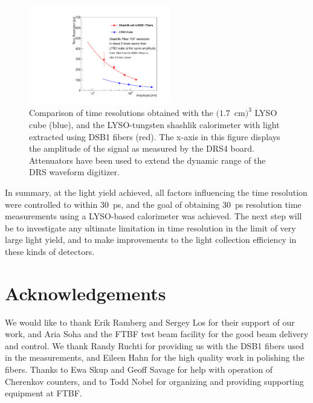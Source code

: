\documentclass[12pt]{article}
\begin{document}
\begin{figure}[H] \centering
\includegraphics[width=0.55\textwidth]{figs/TimeResolutionVsEnergy_ShashlikDSB1FiberAndCube} 
\caption{Comparison of time resolutions obtained with the $(1.7$~cm$)^{3}$ LYSO cube (blue), and the LYSO-tungsten shashlik calorimeter with light extracted using DSB1 fibers (red). The x-axis in this figure displays the amplitude of the signal as measured by the DRS4 board. Attenuators
 have been used to extend the dynamic range of the DRS waveform digitizer. }
\label{fig:ShashlikFiberAndCubeTOF}
\end{figure}

In summary, at the light yield achieved, all factors influencing the time resolution
were controlled to within $30$~ps, and the goal of obtaining $30$~ps
resolution time measurements using a LYSO-based calorimeter
was achieved. The next step will be to investigate any ultimate limitation in time 
resolution in the limit of very large light yield,
and to make improvements to the light collection efficiency 
in these kinds of detectors.

\section{Acknowledgements}
We would like to thank Erik Ramberg and Sergey Los for their support 
of our work, and Aria Soha and the FTBF test beam facility for the
good beam delivery and control. We thank Randy Ruchti for providing us
with the DSB1 fibers used in the measurements, and Eileen Hahn for the
high quality work in polishing the fibers. Thanks to Ewa Skup and Geoff
Savage for help with operation of Cherenkov counters, and to Todd Nobel
for organizing and providing supporting equipment at FTBF.


{}

\end{document}

